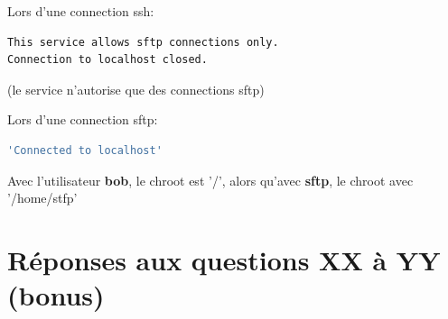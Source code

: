 \documentclass[10pt]{article}
\begin{document}
Lors d'une connection ssh:

\begin{lstlisting}[language=bash]
This service allows sftp connections only.
Connection to localhost closed.
\end{lstlisting}

(le service n'autorise que des connections sftp)

Lors d'une connection sftp:

\begin{lstlisting}[language=bash]
'Connected to localhost'
\end{lstlisting}

Avec l'utilisateur \textbf{bob}, le chroot est '/', alors qu'avec \textbf{sftp}, le chroot avec '/home/stfp'


    \section{Réponses aux questions XX à YY (bonus)}
\end{document}
